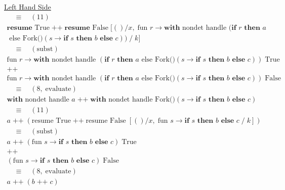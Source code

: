 \documentclass[logo,bsc,singlespacing,parskip]{infthesis}
\begin{document}
\underline{Left Hand Side}
\[
\begin{array}{l}
\quad \equiv \quad (11) \\[5pt]
\textbf{resume }\text{True} \;\texttt{++}\; \textbf{resume } \text{False} \; [()/x,\; \text{fun } r \rightarrow \textbf{with } \text{nondet handle } (\textbf{if } r \textbf{ then } a \\ \text{ else Fork()}(s \rightarrow \textbf{if }  s \textbf{ then } b \textbf{ else } c)) \;/\; k] \\[5pt]

\quad \equiv \quad (\text{subst}) \\[5pt]
\text{fun } r \rightarrow \textbf{with } \text{nondet handle } (\textbf{if } r \textbf{ then } a \text{ else Fork()}(s \rightarrow \textbf{if } s \textbf{ then } b \textbf{ else } c)) \;\text{True} \\[2pt]
\texttt{++} \\ 
\text{fun } r \rightarrow \textbf{with } \text{nondet handle } (\textbf{if } r \textbf{ then } a \text{ else Fork()}(s \rightarrow \textbf{if } s \textbf{ then } b \textbf{ else } c)) \;\text{False} \\[5pt]

\quad \equiv \quad (8,\; \text{evaluate}) \\[5pt]
\textbf{with } \text{nondet handle } a \;\texttt{++}\; \textbf{with } \text{nondet handle } \text{Fork()}(s \rightarrow \textbf{if } s \textbf{ then } b \textbf{ else } c) \\[5pt]

\quad \equiv \quad (11) \\[5pt]
a \;\texttt{++}\; (\text{resume True} \;\texttt{++}\; \text{resume False} \; [()/x,\; \text{fun } s \rightarrow \textbf{if } s \textbf{ then } b \textbf{ else } c \;/\; k]) \\[5pt]

\quad \equiv \quad (\text{subst}) \\[5pt]
a \;\texttt{++}\; (\text{fun } s \rightarrow \textbf{if } s \textbf{ then } b \textbf{ else } c) \;\text{True} \\
\texttt{++} \\
(\text{fun } s \rightarrow \textbf{if } s \textbf{ then } b \textbf{ else } c) \;\text{False} \\[5pt]

\quad \equiv \quad (8,\; \text{evaluate}) \\[5pt]
a \;\texttt{++}\; (b \;\texttt{++}\; c)
\end{array}
\]
\end{document}
